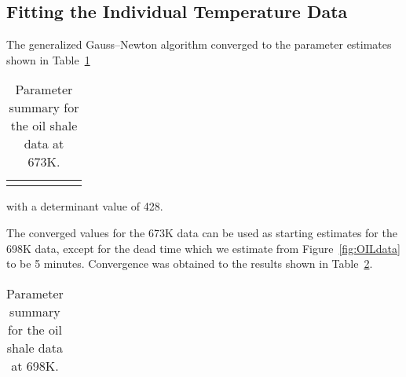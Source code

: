 \subsection{Fitting the Individual Temperature Data}

The generalized Gauss--Newton algorithm converged to the parameter
estimates shown in Table~\ref{tbl:oil.400}
\begin{table}
  \caption{\label{tbl:oil.400}
  Parameter summary for the oil shale data at 673K.
  }
  \begin{tabular}{l r r r r r}
    \mbox{}
  \end{tabular}
\end{table}
with a determinant value of 428.

The converged values for the 673K data can be used as
starting estimates for the 698K data, except for the dead time
which we estimate from Figure~\ref{fig:OILdata} to be 5 minutes.
Convergence was obtained to the results shown
in Table~\ref{tbl:oil.425}.
\begin{table}
  \caption{\label{tbl:oil.425}
  Parameter summary for the oil shale data at 698K.
  }
  \begin{tabular}{l r r r r r}
  \end{tabular}
\end{table}

